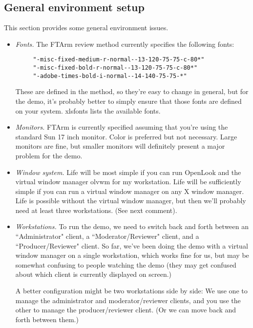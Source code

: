 \subsection{General environment setup}
This section provides some general environment issues.
\begin{itemize}
\item {\em Fonts.} The FTArm review method currently specifies the
following fonts:
     \begin{verbatim}
     "-misc-fixed-medium-r-normal--13-120-75-75-c-80*"
     "-misc-fixed-bold-r-normal--13-120-75-75-c-80*"
     "-adobe-times-bold-i-normal--14-140-75-75-*"
     \end{verbatim}

    These are defined in the method, so they're easy to change in general,
    but for the demo, it's probably better to simply ensure that those
    fonts are defined on your system. xlsfonts lists the available fonts. 


\item {\em Monitors.}  FTArm is currently specified assuming that you're using the
    standard Sun 17 inch monitor.  Color is preferred but not necessary.  Large
    monitors are fine, but smaller monitors will definitely present a major
    problem for the demo.  
  
\item {\em Window system.}  Life will be most simple if you can run OpenLook and
    the virtual window manager olvwm for my workstation.   Life will be 
    sufficiently simple if you can run a virtual window manager on any X
    window manager.  Life is possible without the virtual window manager,
    but then we'll probably need at least three workstations.  (See next comment).

\item {\em Workstations.}  To run the demo, we need to switch back and forth between
    an ``Administrator" client, a ``Moderator/Reviewer" client, and a
    ``Producer/Reviewer" client.  So far, we've been doing the demo with a
    virtual window manager on a single workstation, which works fine for
    us, but may be somewhat confusing to people watching the demo (they may
    get confused about which client is currently displayed on screen.)

    A better configuration might be two workstations side by side: We use
    one to manage the administrator and moderator/reviewer clients, and you
    use the other to manage the producer/reviewer client. (Or we can move
    back and forth between them.)
\end{itemize}

